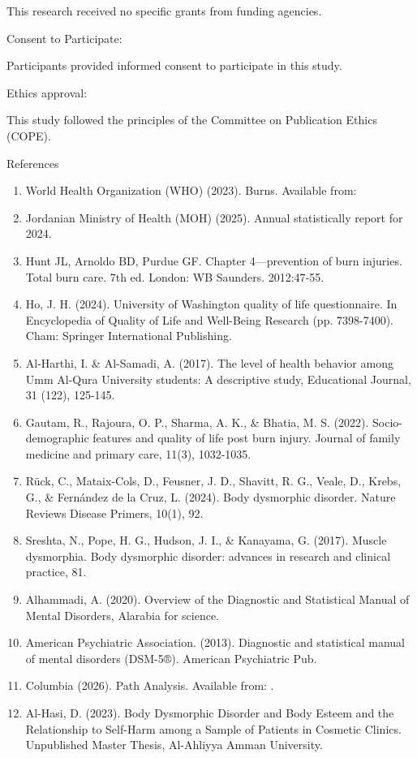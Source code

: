 \documentclass[10pt]{NSP1}
\begin{document}
This research received no specific grants from funding agencies.

Consent to Participate:

Participants provided informed consent to participate in this study.

Ethics approval:

This study followed the principles of the Committee on Publication Ethics (COPE).

References

\begin{enumerate}
  \item World Health Organization (WHO) (2023). Burns. Available from: 
  \item Jordanian Ministry of Health (MOH) (2025). Annual statistically report for 2024.
  \item Hunt JL, Arnoldo BD, Purdue GF. Chapter 4—prevention of burn injuries. Total burn care. 7th ed. London: WB Saunders. 2012:47‑55.
  \item Ho, J. H. (2024). University of Washington quality of life questionnaire. In Encyclopedia of Quality of Life and Well-Being Research (pp. 7398-7400). Cham: Springer International Publishing.
  \item Al-Harthi, I. \& Al-Samadi, A. (2017). The level of health behavior among Umm Al-Qura University students: A descriptive study, Educational Journal, 31 (122), 125-145.
  \item Gautam, R., Rajoura, O. P., Sharma, A. K., \& Bhatia, M. S. (2022). Socio-demographic features and quality of life post burn injury. Journal of family medicine and primary care, 11(3), 1032-1035.
  \item Rück, C., Mataix-Cols, D., Feusner, J. D., Shavitt, R. G., Veale, D., Krebs, G., \& Fernández de la Cruz, L. (2024). Body dysmorphic disorder. Nature Reviews Disease Primers, 10(1), 92.
  \item Sreshta, N., Pope, H. G., Hudson, J. I., \& Kanayama, G. (2017). Muscle dysmorphia. Body dysmorphic disorder: advances in research and clinical practice, 81.
  \item Alhammadi, A. (2020). Overview of the Diagnostic and Statistical Manual of Mental Disorders, Alarabia for science.
  \item American Psychiatric Association. (2013). Diagnostic and statistical manual of mental disorders (DSM-5®). American Psychiatric Pub.
  \item Columbia (2026). Path Analysis. Available from: .
  \item Al-Hasi, D. (2023). Body Dysmorphic Disorder and Body Esteem and the Relationship to Self-Harm among a Sample of Patients in Cosmetic Clinics. Unpublished Master Thesis, Al-Ahliyya Amman University.

\end{enumerate}
\end{document}
